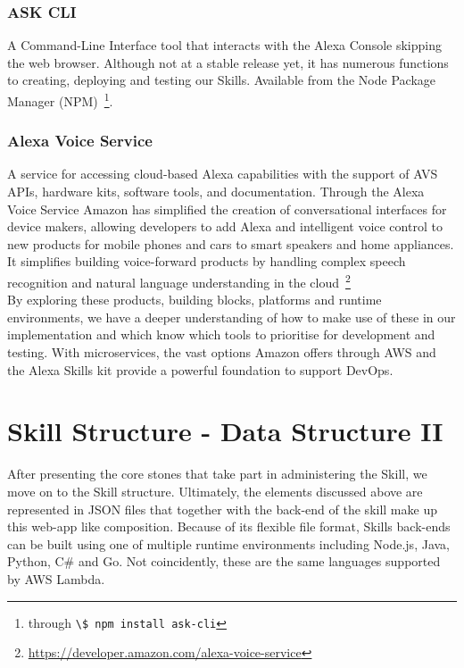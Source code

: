 		\subsubsection*{ASK CLI} %
		A Command-Line Interface tool that interacts with the Alexa Console skipping the web browser. %
		Although not at a stable release yet, it has numerous functions to creating, deploying and testing our Skills. %
		Available from the Node Package Manager (NPM)~\footnote{
			through \lstinline|\$ npm install ask-cli| }.
		
		
		\subsubsection*{Alexa Voice Service} %
		 A service for accessing cloud-based Alexa capabilities with the support of AVS APIs, hardware kits, software tools, and documentation. Through the Alexa Voice Service Amazon has simplified the creation of conversational interfaces for device makers, allowing developers to add Alexa and intelligent voice control to new products for mobile phones and cars to smart speakers and home appliances.
		 It simplifies building voice-forward products by handling complex speech recognition and natural language understanding in the cloud~\footnote{\url{https://developer.amazon.com/alexa-voice-service}}\\



By exploring these products, building blocks, platforms and runtime environments, we have a deeper understanding of how to make use of these in our implementation and which know which tools to prioritise for development and testing. With microservices, the vast options Amazon offers through AWS and the Alexa Skills kit provide a powerful foundation to support DevOps.
	


\section[Data Structure II]{Skill Structure - Data Structure II}


After presenting the core stones that take part in administering the Skill, we move on to the Skill structure. Ultimately, the elements discussed above are represented in JSON files that together with the back-end of the skill make up this web-app like composition. Because of its flexible file format, Skills back-ends can be built using one of multiple runtime environments including Node.js, Java, Python, C\# and Go. 
Not coincidently, these are the same languages supported by AWS Lambda. %

